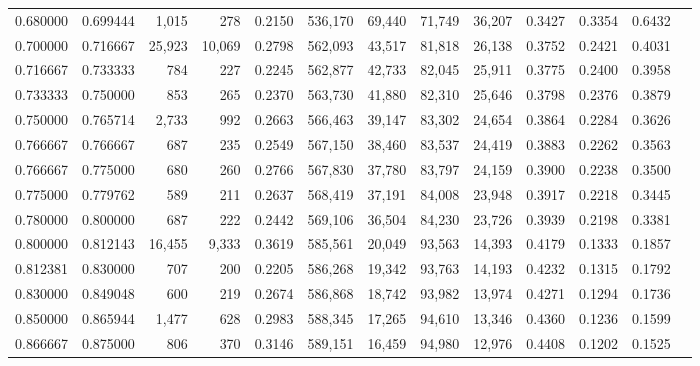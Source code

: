 \begin{tabular}{rrrrrrrrrrrrr}
0.680000 & 0.699444 &  1,015 &    278 &                                     0.2150 & 536,170 &  69,440 &  71,749 &  36,207 & 0.3427 & 0.3354 & 0.6432 \\
0.700000 & 0.716667 & 25,923 & 10,069 &                                     0.2798 & 562,093 &  43,517 &  81,818 &  26,138 & 0.3752 & 0.2421 & 0.4031 \\
0.716667 & 0.733333 &    784 &    227 &                                     0.2245 & 562,877 &  42,733 &  82,045 &  25,911 & 0.3775 & 0.2400 & 0.3958 \\
0.733333 & 0.750000 &    853 &    265 &                                     0.2370 & 563,730 &  41,880 &  82,310 &  25,646 & 0.3798 & 0.2376 & 0.3879 \\
0.750000 & 0.765714 &  2,733 &    992 &                                     0.2663 & 566,463 &  39,147 &  83,302 &  24,654 & 0.3864 & 0.2284 & 0.3626 \\
0.766667 & 0.766667 &    687 &    235 &                                     0.2549 & 567,150 &  38,460 &  83,537 &  24,419 & 0.3883 & 0.2262 & 0.3563 \\
0.766667 & 0.775000 &    680 &    260 &                                     0.2766 & 567,830 &  37,780 &  83,797 &  24,159 & 0.3900 & 0.2238 & 0.3500 \\
0.775000 & 0.779762 &    589 &    211 &                                     0.2637 & 568,419 &  37,191 &  84,008 &  23,948 & 0.3917 & 0.2218 & 0.3445 \\
0.780000 & 0.800000 &    687 &    222 &                                     0.2442 & 569,106 &  36,504 &  84,230 &  23,726 & 0.3939 & 0.2198 & 0.3381 \\
0.800000 & 0.812143 & 16,455 &  9,333 &                                     0.3619 & 585,561 &  20,049 &  93,563 &  14,393 & 0.4179 & 0.1333 & 0.1857 \\
0.812381 & 0.830000 &    707 &    200 &                                     0.2205 & 586,268 &  19,342 &  93,763 &  14,193 & 0.4232 & 0.1315 & 0.1792 \\
0.830000 & 0.849048 &    600 &    219 &                                     0.2674 & 586,868 &  18,742 &  93,982 &  13,974 & 0.4271 & 0.1294 & 0.1736 \\
0.850000 & 0.865944 &  1,477 &    628 &                                     0.2983 & 588,345 &  17,265 &  94,610 &  13,346 & 0.4360 & 0.1236 & 0.1599 \\
0.866667 & 0.875000 &    806 &    370 &                                     0.3146 & 589,151 &  16,459 &  94,980 &  12,976 & 0.4408 & 0.1202 & 0.1525 \\

\end{tabular}
